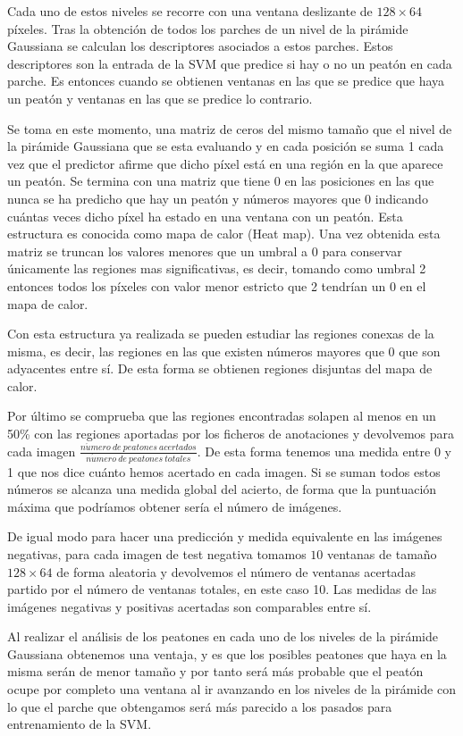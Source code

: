 \documentclass[a4paper,12pt]{article}
\begin{document}
Cada uno de estos niveles se recorre con una ventana deslizante de $128\times 64$ píxeles. Tras la obtención de todos los parches de un nivel de la pirámide Gaussiana se calculan los descriptores asociados a estos parches. Estos descriptores son la entrada de la SVM que predice si hay o no un peatón en cada parche. Es entonces cuando se obtienen ventanas en las que se predice que haya un peatón y ventanas en las que se predice lo contrario.

Se toma en este momento, una matriz de ceros del mismo tamaño que el nivel de la pirámide Gaussiana que se esta evaluando y en cada posición se suma 1 cada vez que el predictor afirme que dicho píxel está en una región en la que aparece un peatón. Se termina con una matriz que tiene 0 en las posiciones en las que nunca se ha predicho que hay un peatón y números mayores que 0 indicando cuántas veces dicho píxel ha estado en una ventana con un peatón. Esta estructura es conocida como mapa de calor (Heat map). Una vez obtenida esta matriz se truncan los valores menores que un umbral a 0 para conservar únicamente las regiones mas significativas, es decir, tomando como umbral 2 entonces todos los píxeles con valor menor estricto que 2 tendrían un 0 en el mapa de calor.

Con esta estructura ya realizada se pueden estudiar las regiones conexas de la misma, es decir, las regiones en las que existen números mayores que 0 que son adyacentes entre sí. De esta forma se obtienen regiones disjuntas del mapa de calor.

Por último se comprueba que las regiones encontradas solapen al menos en un 50\% con las regiones aportadas por los ficheros de anotaciones y devolvemos para cada imagen $\frac{n\acute{u}mero \ de \ peatones \ acertados}{n\acute{u}mero \ de \ peatones \ totales}$. De esta forma tenemos una medida entre 0 y 1 que nos dice cuánto hemos acertado en cada imagen. Si se suman todos estos números se alcanza una medida global del acierto, de forma que la puntuación máxima que podríamos obtener sería el número de imágenes.

De igual modo para hacer una predicción y medida equivalente en las imágenes negativas, para cada imagen de test negativa tomamos $10$ ventanas de tamaño $128\times 64$ de forma aleatoria y devolvemos el número de ventanas acertadas partido por el número de ventanas totales, en este caso 10. Las medidas de las imágenes negativas y positivas acertadas son comparables entre sí.

Al realizar el análisis de los peatones en cada uno de los niveles de la pirámide Gaussiana obtenemos una ventaja, y es que los posibles peatones que haya en la misma serán de menor tamaño y por tanto será más probable que el peatón ocupe por completo una ventana al ir avanzando en los niveles de la pirámide con lo que el parche que obtengamos será más parecido a los pasados para entrenamiento de la SVM.
\end{document}
